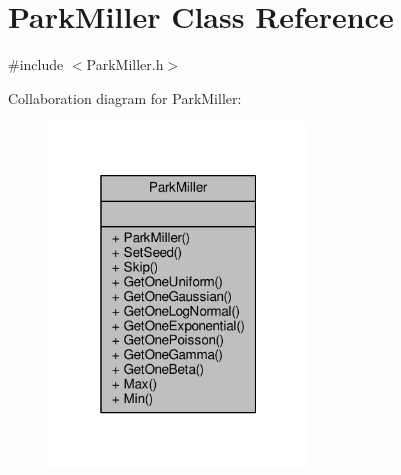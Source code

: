 \hypertarget{classParkMiller}{}\section{Park\+Miller Class Reference}
\label{classParkMiller}


{\ttfamily \#include $<$Park\+Miller.\+h$>$}



Collaboration diagram for Park\+Miller\+:
\nopagebreak
\begin{figure}[H]
\begin{center}
\leavevmode
\includegraphics[width=196pt]{classParkMiller__coll__graph}
\end{center}
\end{figure}
